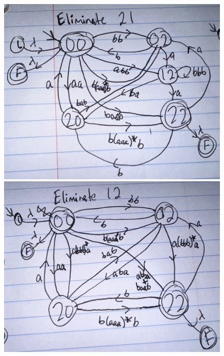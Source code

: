 \documentclass[12pt]{article}
\begin{document}
\begin{figure} [!h]
	\centering
	\includegraphics[scale=.2]{14.10.3.5}
	\includegraphics[scale=.2]{14.10.3.6}
\end{figure}
\end{document}
